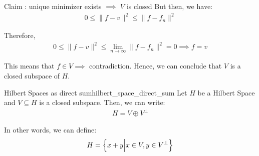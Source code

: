 \begin{proof*}
\begin{subproof}{\newline Claim : unique minimizer exists $\implies$ $V$ is closed}
        \noindent But then, we have:
        \begin{align*}
            0 \le \|f - v\|^2 \le \|f - f_n\|^2
        \end{align*}

        \noindent Therefore,
        \begin{align*}
            0 \le \|f - v\|^2 \le \lim_{n\to\infty} \|f - f_n\|^2 = 0 \implies f = v
        \end{align*}

        \noindent This means that $f \in V \implies$ contradiction. Hence, we can conclude that $V$ is a closed subspace of $H$.
    \end{subproof}
\end{proof*}

\begin{corollary}{Hilbert Spaces as direct sum}{hilbert_space_direct_sum}
    Let $H$ be a Hilbert Space and $V\subseteq H$ is a closed subspace. Then, we can write:
    \begin{align*}
        H = V \oplus V^\perp
    \end{align*}

    \noindent In other words, we can define:
    \begin{align*}
        H = \Big\{ 
            x + y \Big| x\in V, y \in V^\perp 
         \Big\}
    \end{align*}
\end{corollary}

